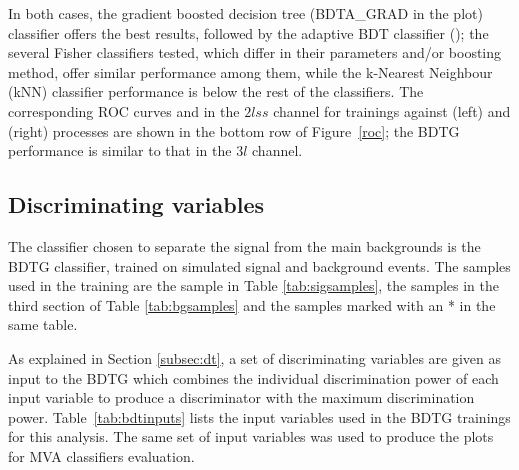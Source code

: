 In both cases, the gradient boosted decision tree  (BDTA\_GRAD in the plot) classifier offers the best results, followed by the adaptive BDT classifier (); the several Fisher classifiers tested, which differ in their parameters and/or boosting method, offer similar performance among them, while the k-Nearest Neighbour (kNN) classifier performance is below the rest of the classifiers. The corresponding ROC curves and in the $2lss$ channel for trainings against \ttV (left) and \ttbar (right) processes are shown in the bottom row of Figure~\ref{roc}; the BDTG performance is similar to that in the $3l$ channel.

\subsection{Discriminating variables}

The classifier chosen to separate the \tHq signal from the main backgrounds is the BDTG classifier, trained on simulated signal and background events. The samples used in the training are the \tHq sample in Table \ref{tab:sigsamples}, the samples in the third section of Table \ref{tab:bgsamples} and the samples marked with an * in the same table.

As explained in Section \ref{subsec:dt}, a set of discriminating variables are given as input to the BDTG which combines the individual discrimination power of each input variable to produce a discriminator with the maximum discrimination power. Table~\ref{tab:bdtinputs} lists the input variables used in the BDTG trainings for this analysis. The same set of input variables was used to produce the plots for MVA classifiers evaluation. 

